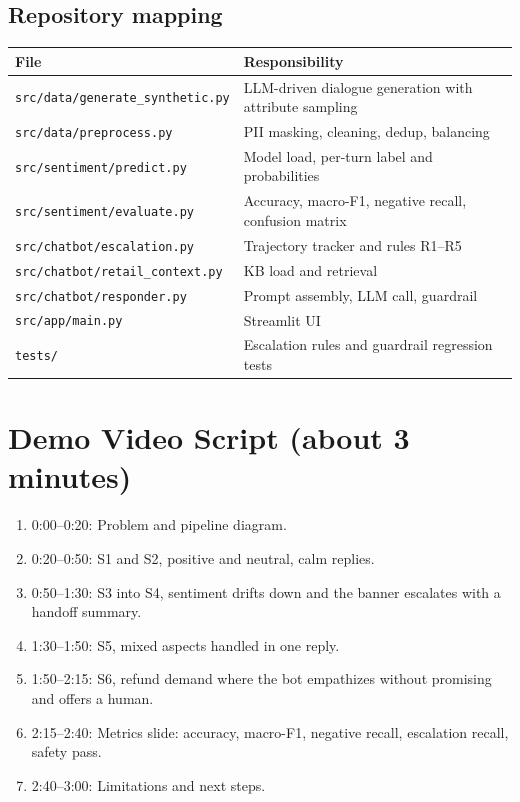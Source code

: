\documentclass[11pt,a4paper]{article}
\begin{document}
\subsection{Repository mapping}
\begin{center}
\begin{tabular}{@{}p{5.6cm}p{8.4cm}@{}}
\toprule
\textbf{File} & \textbf{Responsibility}\\
\midrule
\texttt{src/data/generate\_synthetic.py} & LLM-driven dialogue generation with attribute sampling\\
\texttt{src/data/preprocess.py} & PII masking, cleaning, dedup, balancing\\
\texttt{src/sentiment/predict.py} & Model load, per-turn label and probabilities\\
\texttt{src/sentiment/evaluate.py} & Accuracy, macro-F1, negative recall, confusion matrix\\
\texttt{src/chatbot/escalation.py} & Trajectory tracker and rules R1--R5\\
\texttt{src/chatbot/retail\_context.py} & KB load and retrieval\\
\texttt{src/chatbot/responder.py} & Prompt assembly, LLM call, guardrail\\
\texttt{src/app/main.py} & Streamlit UI\\
\texttt{tests/} & Escalation rules and guardrail regression tests\\
\bottomrule
\end{tabular}
\end{center}

\section{Demo Video Script (about 3 minutes)}
\begin{enumerate}
\item 0:00--0:20: Problem and pipeline diagram.
\item 0:20--0:50: S1 and S2, positive and neutral, calm replies.
\item 0:50--1:30: S3 into S4, sentiment drifts down and the banner escalates with a handoff summary.
\item 1:30--1:50: S5, mixed aspects handled in one reply.
\item 1:50--2:15: S6, refund demand where the bot empathizes without promising and offers a human.
\item 2:15--2:40: Metrics slide: accuracy, macro-F1, negative recall, escalation recall, safety pass.
\item 2:40--3:00: Limitations and next steps.
\end{enumerate}
\end{document}

